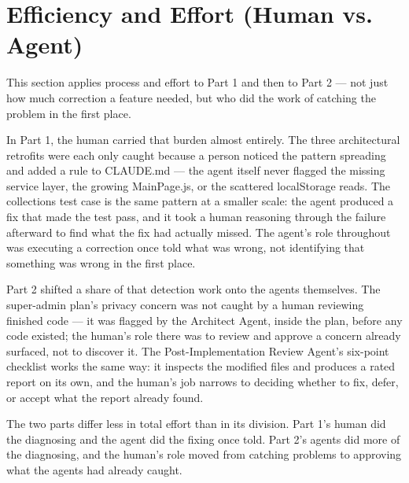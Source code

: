 \section{Efficiency and Effort (Human vs. Agent)}

This section applies process and effort to Part 1 and then to Part 2 --- not just how much correction a feature needed, but who did the work of catching the problem in the first place.

In Part 1, the human carried that burden almost entirely. The three architectural retrofits were each only caught because a person noticed the pattern spreading and added a rule to CLAUDE.md --- the agent itself never flagged the missing service layer, the growing MainPage.js, or the scattered localStorage reads. The collections test case is the same pattern at a smaller scale: the agent produced a fix that made the test pass, and it took a human reasoning through the failure afterward to find what the fix had actually missed. The agent's role throughout was executing a correction once told what was wrong, not identifying that something was wrong in the first place.

Part 2 shifted a share of that detection work onto the agents themselves. The super-admin plan's privacy concern was not caught by a human reviewing finished code --- it was flagged by the Architect Agent, inside the plan, before any code existed; the human's role there was to review and approve a concern already surfaced, not to discover it. The Post-Implementation Review Agent's six-point checklist works the same way: it inspects the modified files and produces a rated report on its own, and the human's job narrows to deciding whether to fix, defer, or accept what the report already found.

The two parts differ less in total effort than in its division. Part 1's human did the diagnosing and the agent did the fixing once told. Part 2's agents did more of the diagnosing, and the human's role moved from catching problems to approving what the agents had already caught.

